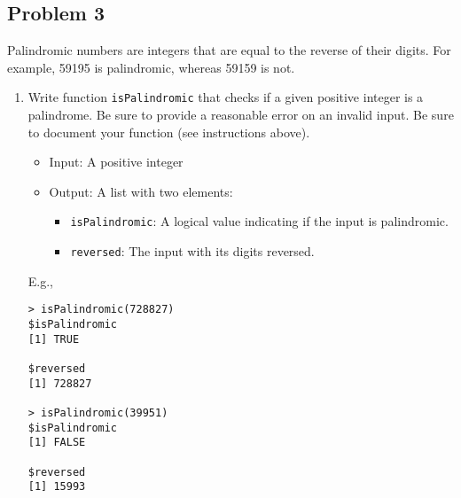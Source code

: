 \documentclass[
  letterpaper,
  DIV=11,
  numbers=noendperiod]{scrartcl}
\begin{document}
\subsection{Problem 3}\label{problem-3}

Palindromic numbers are integers that are equal to the reverse of their
digits. For example, 59195 is palindromic, whereas 59159 is not.

\begin{enumerate}
\def\labelenumi{\alph{enumi}.}
\item
  Write function \texttt{isPalindromic} that checks if a given positive
  integer is a palindrome. Be sure to provide a reasonable error on an
  invalid input. Be sure to document your function (see instructions
  above).

  \begin{itemize}
  \item
    Input: A positive integer
  \item
    Output: A list with two elements:

    \begin{itemize}
    \item
      \texttt{isPalindromic}: A logical value indicating if the input is
      palindromic.
    \item
      \texttt{reversed}: The input with its digits reversed.
    \end{itemize}
  \end{itemize}

  E.g.,

\begin{verbatim}
> isPalindromic(728827)
$isPalindromic
[1] TRUE

$reversed
[1] 728827

> isPalindromic(39951)
$isPalindromic
[1] FALSE

$reversed
[1] 15993
\end{verbatim}
\end{enumerate}
\end{document}
